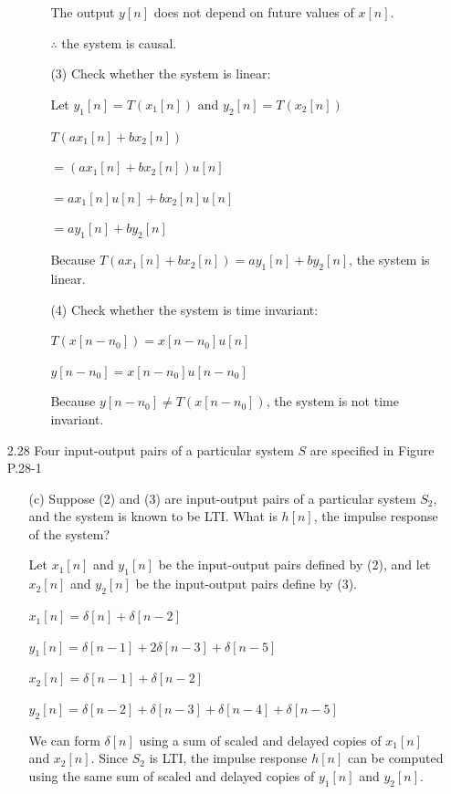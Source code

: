 \documentclass[fleqn]{article}
\begin{document}
\begin{enumerate}[nolistsep]
\begin{enumerate}[nolistsep]
\begin{enumerate}[nolistsep]
					The output $y[n]$ does not depend on future values of $x[n]$.
					
					$\therefore$ the system is causal.
					
					\item[(3)] Check whether the system is linear:
					
					Let $y_1[n] = T(x_1[n])$ and $y_2[n] = T(x_2[n])$
					
					$T(ax_1[n] + bx_2[n])$
					
					$ = (ax_1[n] + bx_2[n])u[n]$
					
					$ = ax_1[n]u[n] + bx_2[n]u[n]$
					
					$ = ay_1[n] + by_2[n]$
					
					Because $T(ax_1[n] + bx_2[n]) = ay_1[n] + by_2[n]$, the system is linear.
					
					\item[(4)] Check whether the system is time invariant:
					
					$T(x[n-n_0]) = x[n-n_0]u[n]$
					
					$y[n-n_0] = x[n-n_0]u[n-n_0]$
					
					Because $y[n-n_0] \neq T(x[n-n_0])$, the system is not time invariant.
				\end{enumerate}
			
			
			
		\end{enumerate}
		
		\item[2.28] Four input-output pairs of a particular system $S$ are specified in Figure P.28-1
		
			\begin{enumerate}
				\item[(c)] Suppose (2) and (3) are input-output pairs of a particular system $S_2$, and the system is known to be LTI. What is $h[n]$, the impulse response of the system?
				
				Let $x_1[n]$ and $y_1[n]$ be the input-output pairs defined by (2), and let $x_2[n]$ and $y_2[n]$ be the input-output pairs define by (3).
				
			$x_1[n] = \delta[n] + \delta[n-2]$
			
			$y_1[n] = \delta[n-1] + 2\delta[n-3] + \delta[n-5]$
			
			$x_2[n] = \delta[n-1] + \delta[n-2]$
			
			$y_2[n] = \delta[n-2] + \delta[n-3] + \delta[n-4] + \delta[n-5]$
			
			We can form $\delta[n]$ using a sum of scaled and delayed copies of $x_1[n]$ and $x_2[n]$. Since $S_2$ is LTI, the impulse response $h[n]$ can be computed using the same sum of scaled and delayed copies of $y_1[n]$ and $y_2[n]$.
			

\end{enumerate}
\end{enumerate}
\end{document}

